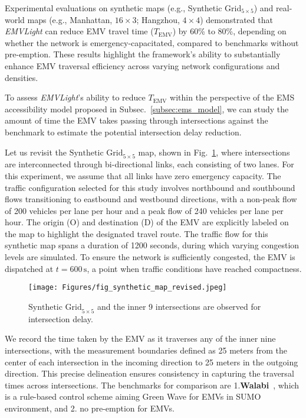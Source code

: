 Experimental evaluations on synthetic maps (e.g., Synthetic Grid\(_{5 \times 5}\)) 
and real-world maps (e.g., Manhattan, \(16 \times 3\); Hangzhou, \(4 \times 4\)) 
demonstrated that \textit{EMVLight} can reduce EMV travel time (\(T_{\text{EMV}}\)) 
by 60\% to 80\%, depending on whether the network is emergency-capacitated, 
compared to benchmarks without pre-emption. These results highlight the 
framework’s ability to substantially enhance EMV traversal efficiency across 
varying network configurations and densities.

To assess \textit{EMVLight}'s ability to reduce $T_{\text{EMV}}$ within the perspective of the EMS accessibility model proposed in Subsec.~\ref{subsec:ems_model}, we can study the amount of time the EMV takes passing through intersections against the benchmark to estimate the potential intersection delay reduction. 

Let us revisit the $\text{Synthetic Grid}_{5 \times 5}$ map, shown in Fig.~\ref{fig:synthetic_grid}, where intersections are interconnected through bi-directional links, each consisting of two lanes. For this experiment, we assume that all links have zero emergency capacity. The traffic configuration selected for this study involves northbound and southbound flows transitioning to eastbound and westbound directions, with a non-peak flow of 200 vehicles per lane per hour and a peak flow of 240 vehicles per lane per hour. The origin (O) and destination (D) of the EMV are explicitly labeled on the map to highlight the designated travel route. The traffic flow for this synthetic map spans a duration of 1200 seconds, during which varying congestion levels are simulated. To ensure the network is sufficiently congested, the EMV is dispatched at \( t = 600 \, \text{s} \), a point when traffic conditions have reached compactness.
\begin{figure}[h]
    \centering
    \texttt{[image: Figures/fig\_synthetic\_map\_revised.jpeg]} 
    \caption{$\text{Synthetic Grid}_{5\times5}$ and the inner 9 intersections are observed for intersection delay.}
    \label{fig:synthetic_grid}
\end{figure}

We record the time taken by the EMV as it traverses any of the inner nine intersections, with the measurement boundaries defined as 25 meters from the center of each intersection in the incoming direction to 25 meters in the outgoing direction. This precise delineation ensures consistency in capturing the traversal times across intersections. The benchmarks for comparison are 1.\textbf{Walabi}~\cite{bieker2019modelling}, which is a rule-based control scheme aiming Green Wave for EMVs in SUMO environment, and 2. no pre-emption for EMVs. 

